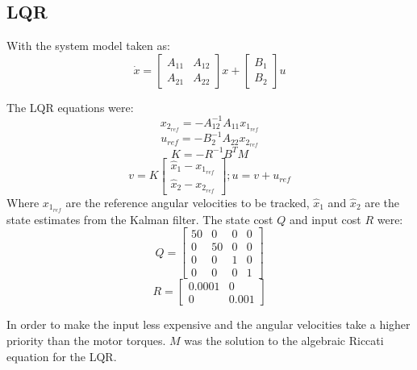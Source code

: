 \documentclass[letterpaper,12pt]{report}
\begin{document}
\subsection{LQR}
With the system model taken as:
\begin{equation}
	\dot x = 
	\begin{bmatrix}
		A_{11} & A_{12} \\ A_{21} & A_{22}
	\end{bmatrix}
	x + 
	\begin{bmatrix}
		B_1 \\ B_2
	\end{bmatrix}
	u
\end{equation}

The LQR equations were:
\begin{equation}
	x_{2_{ref}} = -A_{12}^{-1}A_{11}x_{1_{ref}}
\end{equation}
\begin{equation}
	u_{ref} = -B_2^{-1}A_{22}x_{2_{ref}}
\end{equation}
\begin{equation}
	K = -R^{-1}B^TM
\end{equation}
\begin{equation}
	v = K
	\begin{bmatrix}
		\hat x_1 - x_{1_{ref}}\\ \hat x_2 - x_{2_{ref}}
	\end{bmatrix}
	;
	u = v + u_{ref}
\end{equation}
Where $x_{1_{ref}}$ are the reference angular velocities to be tracked, $\hat x_1$ and $\hat x_2$ are the state estimates from the Kalman filter.
The state cost $Q$ and input cost $R$ were:
\begin{equation}
	Q =
	\begin{bmatrix}
		50 & 0 & 0 & 0 \\ 
		0 & 50 & 0 & 0 \\
		0 & 0 & 1 & 0 \\
		0 & 0 & 0 & 1 
	\end{bmatrix}
\end{equation}
\begin{equation}
	R =
	\begin{bmatrix}
		0.0001 & 0 \\ 
		0 & 0.001
	\end{bmatrix}
\end{equation}

In order to make the input less expensive and the angular velocities take a higher priority than the motor torques.
$M$ was the solution to the algebraic Riccati equation for the LQR.
\end{document}
